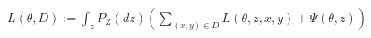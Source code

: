 \documentclass[preview]{standalone}
\begin{document}
\begin{align*}
L (\theta, D) := \int_z P_Z(dz) \left( \sum_{(x,y) \in D} L (\theta, z, x, y) + \Psi (\theta, z) \right)
\end{align*}
\end{document}
